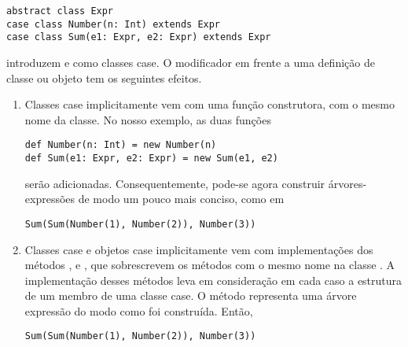\begin{lstlisting}
abstract class Expr
case class Number(n: Int) extends Expr
case class Sum(e1: Expr, e2: Expr) extends Expr
\end{lstlisting}
introduzem  e  como classes case.
O modificador  em frente a uma defini\c{c}\~{a}o de classe ou objeto tem 
os seguintes efeitos.
\begin{enumerate}
\item Classes case implicitamente vem com uma fun\c{c}\~{a}o construtora, com o mesmo nome da classe.
No nosso exemplo, as duas fun\c{c}\~{o}es
\begin{lstlisting}
def Number(n: Int) = new Number(n)
def Sum(e1: Expr, e2: Expr) = new Sum(e1, e2)
\end{lstlisting}

ser\~{a}o adicionadas. Consequentemente, pode-se agora construir \'{a}rvores-express\~{o}es de modo um 
pouco mais conciso, como em
\begin{lstlisting}
Sum(Sum(Number(1), Number(2)), Number(3))
\end{lstlisting} 
\item Classes case e objetos case implicitamente vem com implementa\c{c}\~{o}es dos m\'{e}todos 
,  e , que sobrescrevem os
m\'{e}todos com o mesmo nome na classe . A implementa\c{c}\~{a}o desses 
m\'{e}todos leva em considera\c{c}\~{a}o em cada caso a estrutura de um membro de uma classe 
case. O m\'{e}todo  representa uma \'{a}rvore express\~{a}o do modo como foi
constru\'{i}da. Ent\~{a}o,  
\begin{lstlisting}
Sum(Sum(Number(1), Number(2)), Number(3))
\end{lstlisting} 


\end{enumerate}
